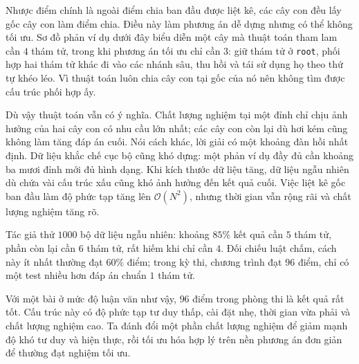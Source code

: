 \documentclass[11pt]{article}
\newcommand{\Oh}{\mathcal{O}}
\begin{document}
Nhược điểm chính là ngoài điểm chia ban đầu được liệt kê, các cây con đều
lấy gốc cây con làm điểm chia. Điều này làm phương án dễ dựng nhưng có thể
không tối ưu. Sơ đồ phản ví dụ dưới đây biểu diễn một cây mà thuật toán tham
lam cần \(4\) thám tử, trong khi phương án tối ưu chỉ cần \(3\): giữ thám tử
ở \texttt{root}, phối hợp hai thám tử khác đi vào các nhánh sâu, thu hồi và
tái sử dụng họ theo thứ tự khéo léo. Vì thuật toán luôn chia cây con tại gốc
của nó nên không tìm được cấu trúc phối hợp ấy.

\begin{center}
\end{center}

Dù vậy thuật toán vẫn có ý nghĩa. Chất lượng nghiệm tại một đỉnh chỉ chịu
ảnh hưởng của hai cây con có nhu cầu lớn nhất; các cây con còn lại dù hơi
kém cũng không làm tăng đáp án cuối. Nói cách khác, lời giải có một khoảng
đàn hồi nhất định. Dữ liệu khắc chế cục bộ cũng khó dựng: một phản ví dụ đầy
đủ cần khoảng ba mươi đỉnh mới đủ hình dạng. Khi kích thước dữ liệu
tăng, dữ liệu ngẫu nhiên dù chứa vài cấu trúc xấu cũng khó ảnh hưởng đến
kết quả cuối. Việc liệt kê gốc ban đầu làm độ phức tạp tăng lên
\(\Oh(N^2)\), nhưng thời gian vẫn rộng rãi và chất lượng nghiệm tăng rõ.

Tác giả thử \(1000\) bộ dữ liệu ngẫu nhiên: khoảng \(85\%\) kết quả cần
\(5\) thám tử, phần còn lại cần \(6\) thám tử, rất hiếm khi chỉ cần \(4\).
Đối chiếu luật chấm, cách này ít nhất thường đạt \(60\%\) điểm; trong kỳ
thi, chương trình đạt \(96\) điểm, chỉ có một test nhiều hơn đáp án chuẩn
\(1\) thám tử.

Với một bài ở mức độ luận văn như vậy, \(96\) điểm trong phòng thi là kết quả
rất tốt. Cấu trúc này có độ phức tạp tư duy thấp, cài đặt nhẹ, thời gian vừa
phải và chất lượng nghiệm cao. Ta đánh đổi một phần chất lượng nghiệm để
giảm mạnh độ khó tư duy và hiện thực, rồi tối ưu hóa hợp lý trên nền phương
án đơn giản để thường đạt nghiệm tối ưu.
\end{document}

